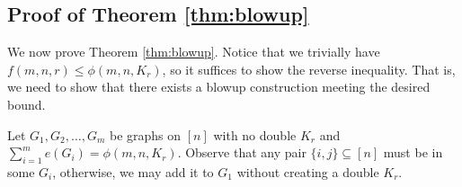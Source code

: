 \documentclass[12pt]{article}
\newcommand{\jv}[1]{\textcolor{red}{\textbf{[JV: } #1\textbf{]}}}
\begin{document}


\subsection{Proof of Theorem \ref{thm:blowup}}

We now prove Theorem \ref{thm:blowup}.
  Notice that we trivially have $f(m, n, r) \leq \phi(m, n, K_r)$, so it suffices to show the reverse inequality. That is, we need to show that there exists  a blowup construction meeting the desired bound.

  Let $G_1, G_2, \ldots, G_m$ be graphs on $[n]$ with no double $K_r$ and $\sum_{i = 1}^m e(G_i) = \phi(m, n, K_r)$. Observe that any pair $\{i, j\} \subseteq [n]$ must be in some $G_i$, otherwise, we may add it to $G_1$ without creating a double $K_r$. 
\end{document}

